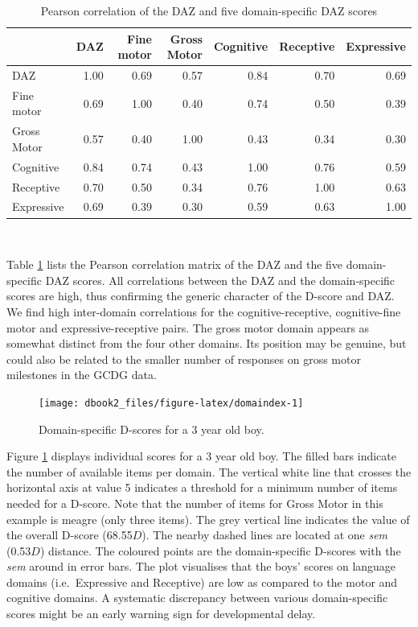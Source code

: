 \documentclass[
]{book}
\begin{document}
\begin{table}

\caption{\label{tab:domaincor}Pearson correlation of the DAZ and five domain-specific DAZ scores}
\centering
\begin{tabular}[t]{l|r|r|r|r|r|r}
\hline
  & DAZ & Fine motor & Gross Motor & Cognitive & Receptive & Expressive\\
\hline
DAZ & 1.00 & 0.69 & 0.57 & 0.84 & 0.70 & 0.69\\
\hline
Fine motor & 0.69 & 1.00 & 0.40 & 0.74 & 0.50 & 0.39\\
\hline
Gross Motor & 0.57 & 0.40 & 1.00 & 0.43 & 0.34 & 0.30\\
\hline
Cognitive & 0.84 & 0.74 & 0.43 & 1.00 & 0.76 & 0.59\\
\hline
Receptive & 0.70 & 0.50 & 0.34 & 0.76 & 1.00 & 0.63\\
\hline
Expressive & 0.69 & 0.39 & 0.30 & 0.59 & 0.63 & 1.00\\
\hline
\end{tabular}
\end{table}

~

Table \ref{tab:domaincor} lists the Pearson correlation matrix of the DAZ and the five domain-specific DAZ scores. All correlations between the DAZ and the domain-specific scores are high, thus confirming the generic character of the D-score and DAZ. We find high inter-domain correlations for the cognitive-receptive, cognitive-fine motor and expressive-receptive pairs. The gross motor domain appears as somewhat distinct from the four other domains. Its position may be genuine, but could also be related to the smaller number of responses on gross motor milestones in the GCDG data.

\begin{figure}

{\centering \texttt{[image: dbook2\_files/figure-latex/domaindex-1]} 

}

\caption{Domain-specific D-scores for a 3 year old boy.}\label{fig:domaindex}
\end{figure}



Figure \ref{fig:domaindex} displays individual scores for a 3 year old boy. The filled bars indicate the number of available items per domain. The vertical white line that crosses the horizontal axis at value 5 indicates a threshold for a minimum number of items needed for a D-score. Note that the number of items for Gross Motor in this example is meagre (only three items). The grey vertical line indicates the value of the overall D-score (68.55\(D\)). The nearby dashed lines are located at one \emph{sem} (0.53\(D\)) distance. The coloured points are the domain-specific D-scores with the \emph{sem} around in error bars. The plot visualises that the boys' scores on language domains (i.e.~Expressive and Receptive) are low as compared to the motor and cognitive domains. A systematic discrepancy between various domain-specific scores might be an early warning sign for developmental delay.
\end{document}
